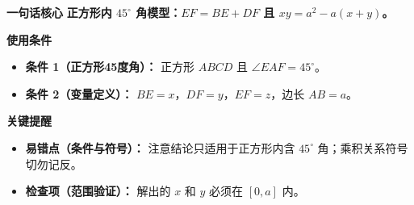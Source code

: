 \begin{summarybox}
	\textbf{\textcolor{CSummary}{一句话核心}}
	\textbf{正方形内 $45^\circ$ 角模型：$EF = BE + DF$ 且 $xy = a^2 - a(x+y)$。}

	\medskip
	\textbf{\textcolor{CSummary}{使用条件}}
	\begin{itemize}[leftmargin=*, itemsep=0.5em, topsep=0.4em]
		\item \textbf{条件 1（正方形45度角）：} 正方形 $ABCD$ 且 $\angle EAF=45^\circ$。
		\item \textbf{条件 2（变量定义）：} $BE = x$，$DF = y$，$EF = z$，边长 $AB = a$。
	\end{itemize}

	\medskip
	\textbf{\textcolor{CSummary}{关键提醒}}
	\begin{itemize}[leftmargin=*, itemsep=0.5em, topsep=0.4em]
		\item \textbf{易错点（条件与符号）：} 注意结论只适用于正方形内含 $45^\circ$ 角；乘积关系符号切勿记反。
		\item \textbf{检查项（范围验证）：} 解出的 $x$ 和 $y$ 必须在 $[0,a]$ 内。
	\end{itemize}

\end{summarybox}
